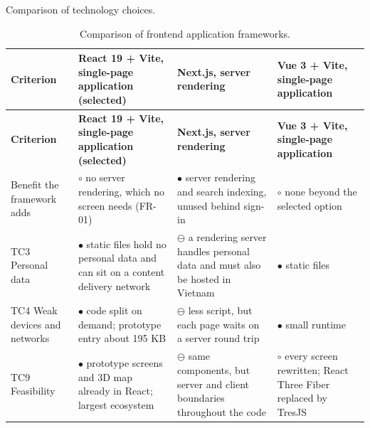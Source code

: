 Comparison of technology choices.

{\small
\begin{longtable}{|>{\raggedright\arraybackslash}p{}|>{\raggedright\arraybackslash}p{}|>{\raggedright\arraybackslash}p{}|>{\raggedright\arraybackslash}p{}|}
\caption{Comparison of frontend application frameworks.} \\
\hline
\textbf{Criterion} & \textbf{React 19 + Vite, single-page application (selected)} & \textbf{Next.js, server rendering\cite{r169}} & \textbf{Vue 3 + Vite, single-page application\cite{r170}} \\ \hline
\endfirsthead
\hline
\textbf{Criterion} & \textbf{React 19 + Vite, single-page application (selected)} & \textbf{Next.js, server rendering\cite{r169}} & \textbf{Vue 3 + Vite, single-page application\cite{r170}} \\ \hline
\endhead
Benefit the framework adds & $\circ$ no server rendering, which no screen needs (FR-01) & $\bullet$ server rendering and search indexing, unused behind sign-in & $\circ$ none beyond the selected option \\ \hline
TC3 Personal data & $\bullet$ static files hold no personal data and can sit on a content delivery network & $\ominus$ a rendering server handles personal data and must also be hosted in Vietnam & $\bullet$ static files \\ \hline
TC4 Weak devices and networks & $\bullet$ code split on demand; prototype entry about 195 KB & $\ominus$ less script, but each page waits on a server round trip & $\bullet$ small runtime \\ \hline
TC9 Feasibility & $\bullet$ prototype screens and 3D map already in React; largest ecosystem\cite{r134} & $\ominus$ same components, but server and client boundaries throughout the code & $\circ$ every screen rewritten; React Three Fiber replaced by TresJS\cite{r171} \\ \hline
\end{longtable}
}

